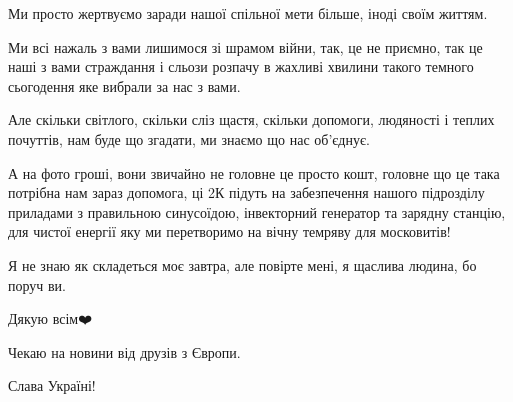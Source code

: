 Ми просто жертвуємо заради нашої спільної мети більше, іноді своїм життям. 

Ми всі нажаль з вами лишимося зі шрамом війни, так, це не приємно, так це
наші з вами страждання і сльози розпачу в жахливі хвилини такого темного
сьогодення яке вибрали за нас з вами.

Але скільки світлого, скільки сліз щастя, скільки допомоги, людяності і теплих
почуттів, нам буде що згадати, ми знаємо що нас об’єднує.

А на фото гроші, вони звичайно не головне це просто кошт, головне що це така
потрібна нам зараз допомога,  ці 2К підуть на забезпечення нашого підрозділу
приладами з правильною синусоїдою, інвекторний генератор та зарядну станцію,
для чистої енергії яку ми перетворимо на вічну темряву для московитів! 

Я не знаю як складеться моє завтра, але повірте мені, я щаслива людина, бо поруч ви. 

Дякую всім❤️

Чекаю на новини від друзів з Європи. 

Слава Україні!
